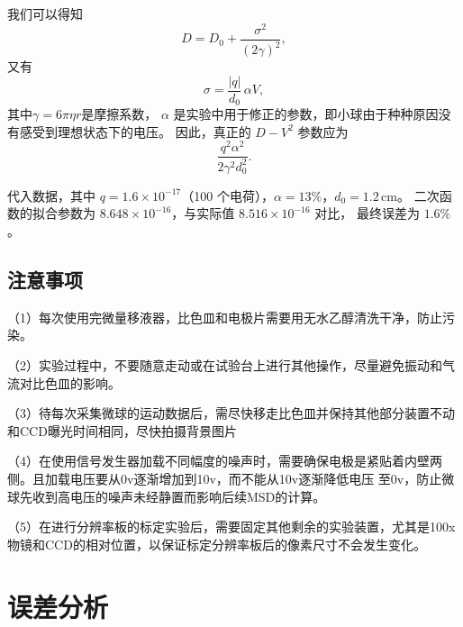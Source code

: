 \documentclass[a4paper]{report} %
\begin{document}
我们可以得知
\begin{equation}
    D = D_0 + \frac{\sigma^2}{(2\gamma)^2},
\end{equation}
又有
\begin{equation}
    \sigma = \frac{|q|}{d_0}\,\alpha V,
\end{equation}
其中$\gamma = 6 \pi \eta r$是摩擦系数， $\alpha$ 是实验中用于修正的参数，即小球由于种种原因没有感受到理想状态下的电压。  
因此，真正的 $D\!-\!V^2$ 参数应为
\begin{equation}
    \frac{q^2 \alpha^2}{2 \gamma^2 d_0^2}.
\end{equation}

代入数据，其中 $q = 1.6\times 10^{-17}$（100 个电荷），$\alpha = 13\%$，$d_0 = 1.2\,\mathrm{cm}$。  
二次函数的拟合参数为 $8.648\times 10^{-16}$，与实际值 $8.516\times 10^{-16}$ 对比，  
最终误差为 $1.6\%$。

\section{注意事项}
（1）每次使用完微量移液器，比色皿和电极片需要用无水乙醇清洗干净，防止污染。\par
（2）实验过程中，不要随意走动或在试验台上进行其他操作，尽量避免振动和气流对比色皿的影响。\par
（3）待每次采集微球的运动数据后，需尽快移走比色皿并保持其他部分装置不动和CCD曝光时间相同，尽快拍摄背景图片 \par
（4）在使用信号发生器加载不同幅度的噪声时，需要确保电极是紧贴着内壁两侧。且加载电压要从0v逐渐增加到10v，而不能从10v逐渐降低电压
至0v，防止微球先收到高电压的噪声未经静置而影响后续MSD的计算。\par
（5）在进行分辨率板的标定实验后，需要固定其他剩余的实验装置，尤其是100x物镜和CCD的相对位置，以保证标定分辨率板后的像素尺寸不会发生变化。\par
\chapter{误差分析}
\end{document}
